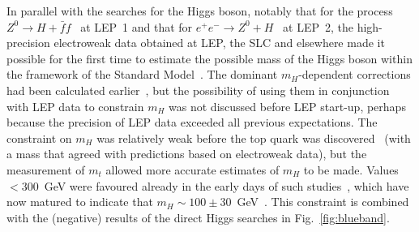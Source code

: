 \documentclass[12pt]{article}
\numberwithin{equation}{section}
\begin{document}
In parallel with the searches for the Higgs boson, notably that for
the process $Z^0 \to H + {\bar f}f$~\cite{EG76,Bj} at LEP~1 and that for
$e^+ e^- \to Z^0 + H$~\cite{EGN,IK,LQT} at LEP~2, the high-precision
electroweak data obtained at LEP, the SLC and elsewhere made it
possible for the first time to estimate the possible mass of the Higgs boson
within the framework of the Standard Model~\cite{EF}. The dominant $m_H$-dependent
corrections had been calculated earlier~\cite{Veltman}, but the possibility of using
them in conjunction with LEP data to constrain $m_H$ was not discussed
before LEP start-up, perhaps because the precision of LEP data exceeded
all previous expectations. The constraint on $m_H$ was relatively weak before
the top quark was discovered~\cite{Tevatront} (with a mass that agreed with predictions
based on electroweak data), but the measurement of $m_t$ allowed more
accurate estimates of $m_H$ to be made. Values $< 300$~GeV were favoured
already in the early days of such studies~\cite{EF}, which have now matured to indicate
that $m_H \sim 100 \pm 30$~GeV~\cite{LEPEWWG}. This constraint is combined with the (negative)
results of the direct Higgs searches in Fig.~\ref{fig:blueband}.
\end{document}
